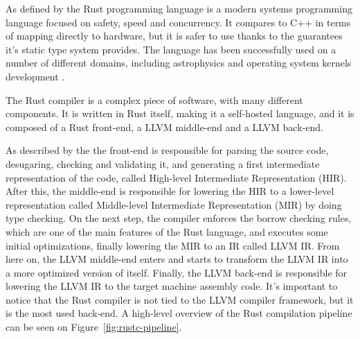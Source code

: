 

\label{cap:introducao}

\enlargethispage{.5\baselineskip}

As defined by \citet{matsakis2014rust} the Rust  programming language is a modern
systems programming language focused on safety, speed and concurrency. It compares
to C++ in terms of mapping directly to hardware, but it is safer to use thanks to
the guarantees it's static type system provides. The language has been successfully
used on a number of different domains, including astrophysics \citep{blanco2016can}
and operating system kernels development \citep{levy2017case}.

The Rust compiler is a complex piece of software, with many different components.
It is written in Rust itself, making it a self-hosted language, and it is composed
of a Rust front-end, a LLVM middle-end and a LLVM back-end.

As described by the \citet{rustc-dev-guide} the front-end is responsible for parsing
the source code, desugaring, checking and validating it, and generating a first intermediate
representation of the code, called High-level Intermediate Representation (HIR). 
After this, the middle-end is responsible for lowering the HIR to a lower-level representation
called Middle-level Intermediate Representation (MIR)  by doing type checking. On the next step,
the compiler enforces the borrow checking rules, which are one of the main features of the Rust language,
and executes some initial optimizations, finally lowering the MIR to an IR called LLVM IR. From here on,
the LLVM middle-end enters and starts to transform the LLVM IR into a more optimized version of itself.
Finally, the LLVM back-end is responsible for lowering the LLVM IR to the target machine assembly code. It's important
to notice that the Rust compiler is not tied to the LLVM compiler framework, but it is the most used back-end.
A high-level overview of the Rust compilation pipeline can be seen on Figure~\ref{fig:rustc-pipeline}.

